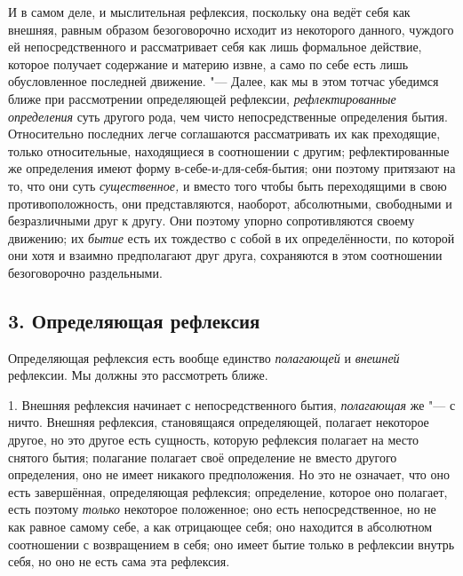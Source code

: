 И в самом деле, и мыслительная рефлексия, поскольку она ведёт себя как
внешняя, равным образом безоговорочно исходит из некоторого данного,
чуждого ей непосредственного и рассматривает себя как лишь формальное
действие, которое получает содержание и материю извне, а само по себе есть
лишь обусловленное последней движение. "--- Далее, как мы в этом тотчас
убедимся ближе при рассмотрении определяющей рефлексии,
{\em рефлектированные определения} суть другого рода,
чем чисто непосредственные определения бытия. Относительно последних легче
соглашаются рассматривать их как преходящие, только относительные,
находящиеся в соотношении с другим; рефлектированные же определения имеют
форму в-себе-и-для-себя-бытия; они поэтому притязают на то, что они суть
{\em существенное,} и вместо того чтобы быть
переходящими в свою противоположность, они представляются, наоборот,
абсолютными, свободными и безразличными друг к другу. Они поэтому упорно
сопротивляются своему движению; их {\em бытие} есть их
тождество с собой в их определённости, по которой они хотя и взаимно
предполагают друг друга, сохраняются в этом соотношении безоговорочно
раздельными.

\subsection[3. Определяющая рефлексия]{3. Определяющая рефлексия}
Определяющая рефлексия есть вообще единство
{\em полагающей} и {\em внешней}
рефлексии. Мы должны это рассмотреть ближе.

1. Внешняя рефлексия начинает с непосредственного бытия,
{\em полагающая} же "--- с ничто. Внешняя рефлексия,
становящаяся определяющей, полагает некоторое другое, но это другое есть
сущность, которую рефлексия полагает на место снятого бытия; полагание
полагает своё определение не вместо другого определения, оно не имеет
никакого предположения. Но это не означает, что оно есть завершённая,
определяющая рефлексия; определение, которое оно полагает, есть поэтому
{\em только} некоторое положенное; оно есть
непосредственное, но не как равное самому себе, а как отрицающее себя; оно
находится в абсолютном соотношении с возвращением в себя; оно имеет бытие
только в рефлексии внутрь себя, но оно не есть сама эта рефлексия.

